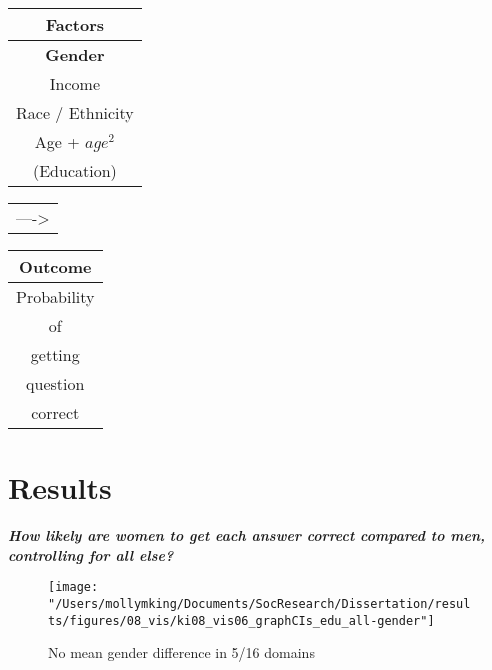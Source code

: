 \documentclass[]{article}
\begin{document}
 \begin{table}[ht]
 \centering
     \begin{tabular}{c}  %
       \hline   %
       Factors          \\
       \hline   %
       \textbf{Gender}           \\
       Income           \\
       Race / Ethnicity \\
       Age + $age^2$    \\
       (Education)        \\
       \hline  %
     \end{tabular}
     \begin{tabular}{l}  %
       ---->
     \end{tabular}
     \begin{tabular}{c}  %
        \hline   %
        Outcome        \\
        \hline   %
        Probability      \\
        of     \\
        getting \\
        question     \\
        correct          \\
        \hline  %
      \end{tabular}
 \end{table}



\newpage
\section{Results}\label{Results}

\emph{\textbf{How likely are women to get each answer correct compared to men, controlling for all else?}}
\begin{figure}[ht]
    \begin{center}
      \texttt{[image: "/Users/mollymking/Documents/SocResearch/Dissertation/results/figures/08\_vis/ki08\_vis06\_graphCIs\_edu\_all-gender"]}
      \caption{No mean gender difference in 5/16 domains}
    \end{center}
\end{figure}
\end{document}
